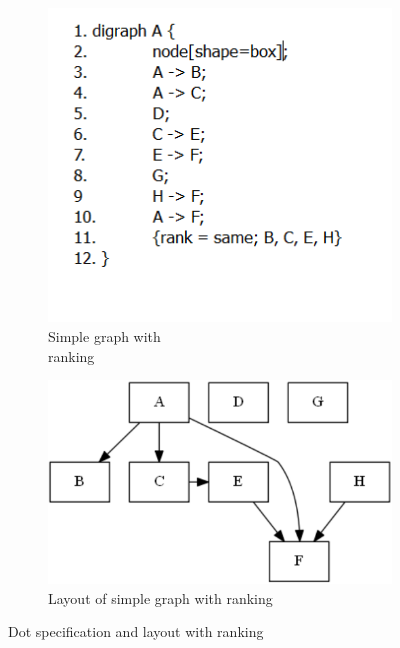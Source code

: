\begin{figure}
	\centering
    \begin{subfigure}[b]{0.4\linewidth}
    	\includegraphics[width=\linewidth]{GV/gvcode_rank.PNG}
        \caption{Simple graph with \\ranking}
        \label{figure : gv rank}
    \end{subfigure}
    \begin{subfigure}[b]{0.4\linewidth}
    	\includegraphics[width=\linewidth]{GV/gvrank.PNG}
        \caption{Layout of simple graph with ranking}
        \label{figure : gv graph rank}
    \end{subfigure}
	\caption{Dot specification and layout with ranking}
    \label{figure : gv with ranks}
\end{figure}

